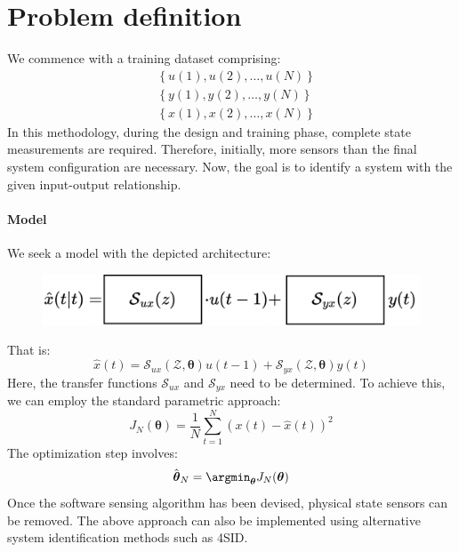 \section{Problem definition}

We commence with a training dataset comprising:
\begin{align*}
    &\left\{u(1),u(2),\dots,u(N)\right\} \\
    &\left\{y(1),y(2),\dots,y(N)\right\} \\
    &\left\{x(1),x(2),\dots,x(N)\right\}
\end{align*}
In this methodology, during the design and training phase, complete state measurements are required. 
Therefore, initially, more sensors than the final system configuration are necessary.
Now, the goal is to identify a system with the given input-output relationship.

\paragraph*{Model}
We seek a model with the depicted architecture:
\begin{figure}[H]
    \centering
    \includegraphics[width=0.75\linewidth]{images/arch.png}
\end{figure}
That is:
\[\hat{x}(t)=\mathcal{S}_{ux}(\mathcal{Z},\boldsymbol{\theta})u(t-1)+\mathcal{S}_{yx}(\mathcal{Z},\boldsymbol{\theta})y(t)\]
Here, the transfer functions $\mathcal{S}_{ux}$ and $\mathcal{S}_{yx}$ need to be determined.
To achieve this, we can employ the standard parametric approach:
\[J_N(\boldsymbol{\theta})=\dfrac{1}{N}\sum_{t=1}^{N}\left(x(t)-\hat{x}(t)\right)^2\]
The optimization step involves:
\[\hat{\boldsymbol{\theta}}_N=\argmin_{\boldsymbol{\theta}}J_N(\boldsymbol{\theta})\]
Once the software sensing algorithm has been devised, physical state sensors can be removed.
The above approach can also be implemented using alternative system identification methods such as 4SID.